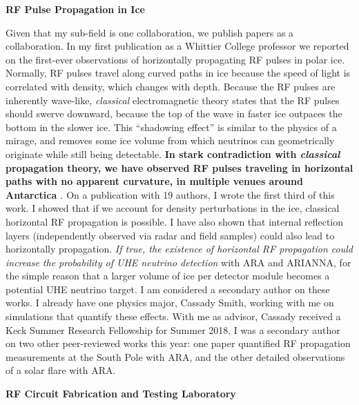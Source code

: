 \documentclass[../main.tex]{subfiles}
\begin{document}
\textbf{RF Pulse Propagation in Ice} \\ \hspace{0.1cm}

Given that my sub-field is one collaboration, we publish papers as a collaboration.  In my first publication as a Whittier College professor we reported on the first-ever observations of horizontally propagating RF pulses in polar ice.  Normally, RF pulses travel along curved paths in ice because the speed of light is correlated with density, which changes with depth.  Because the RF pulses are inherently wave-like, \textit{classical} electromagnetic theory states that the RF pulses should swerve downward, because the top of the wave in faster ice outpaces the bottom in the slower ice.  This ``shadowing effect'' is similar to the physics of a mirage, and removes some ice volume from which neutrinos can geometrically originate while still being detectable.  \textbf{In stark contradiction with \textit{classical} propagation theory, we have observed RF pulses traveling in horizontal paths with no apparent curvature, in multiple venues around Antarctica \cite{horizPaper}}.  On a publication with 19 authors, I wrote the first third of this work.  I showed that if we account for density perturbations in the ice, classical horizontal RF propagation is possible.  I have also shown that internal reflection layers (independently observed via radar and field samples) could also lead to horizontally propagation.  \textit{If true, the existence of horizontal RF propagation could increase the probability of UHE neutrino detection} with ARA and ARIANNA, for the simple reason that a larger volume of ice per detector module becomes a potential UHE neutrino target. I am considered a secondary author on these works. I already have one physics major, Cassady Smith, working with me on simulations that quantify these effects.  With me as advisor, Cassady received a Keck Summer Research Fellowship for Summer 2018.  I was a secondary author on two other peer-reviewed works this year: one paper quantified RF propagation measurements at the South Pole with ARA, and the other detailed observations of a solar flare with ARA. \\ \hspace{0.1cm}

\textbf{RF Circuit Fabrication and Testing Laboratory} \\ \hspace{0.1cm}
\end{document}
